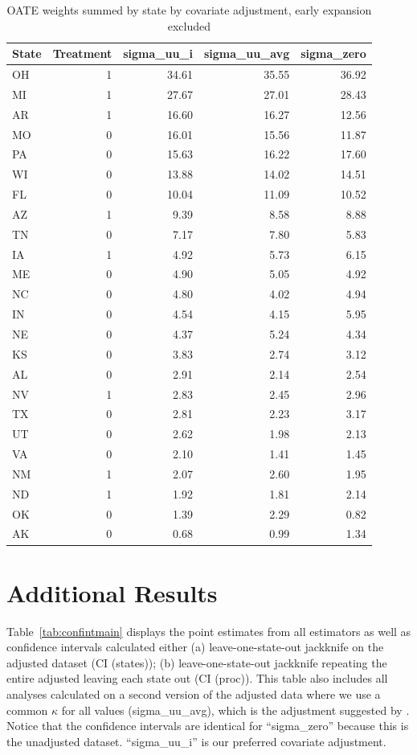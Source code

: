 \documentclass[aoas]{imsart}
\theoremstyle{plain}
\theoremstyle{remark}
\begin{document}
\begin{appendix}
\begin{table}[ht]
\centering
\caption{OATE weights summed by state by covariate adjustment, early expansion excluded}
\label{tab:oatestateweightsc2}
\begin{tabular}{lrrrr}
  \hline
State & Treatment & sigma\_uu\_i & sigma\_uu\_avg & sigma\_zero \\ 
  \hline
OH & 1 & 34.61 & 35.55 & 36.92 \\ 
  MI & 1 & 27.67 & 27.01 & 28.43 \\ 
  AR & 1 & 16.60 & 16.27 & 12.56 \\ 
  MO & 0 & 16.01 & 15.56 & 11.87 \\ 
  PA & 0 & 15.63 & 16.22 & 17.60 \\ 
  WI & 0 & 13.88 & 14.02 & 14.51 \\ 
  FL & 0 & 10.04 & 11.09 & 10.52 \\ 
  AZ & 1 & 9.39 & 8.58 & 8.88 \\ 
  TN & 0 & 7.17 & 7.80 & 5.83 \\ 
  IA & 1 & 4.92 & 5.73 & 6.15 \\ 
  ME & 0 & 4.90 & 5.05 & 4.92 \\ 
  NC & 0 & 4.80 & 4.02 & 4.94 \\ 
  IN & 0 & 4.54 & 4.15 & 5.95 \\ 
  NE & 0 & 4.37 & 5.24 & 4.34 \\ 
  KS & 0 & 3.83 & 2.74 & 3.12 \\ 
  AL & 0 & 2.91 & 2.14 & 2.54 \\ 
  NV & 1 & 2.83 & 2.45 & 2.96 \\ 
  TX & 0 & 2.81 & 2.23 & 3.17 \\ 
  UT & 0 & 2.62 & 1.98 & 2.13 \\ 
  VA & 0 & 2.10 & 1.41 & 1.45 \\ 
  NM & 1 & 2.07 & 2.60 & 1.95 \\ 
  ND & 1 & 1.92 & 1.81 & 2.14 \\ 
  OK & 0 & 1.39 & 2.29 & 0.82 \\ 
  AK & 0 & 0.68 & 0.99 & 1.34 \\ 
   \hline
\end{tabular}
\end{table}

\section{Additional Results}
\label{ssec:allresults}

Table~\ref{tab:confintmain} displays the point estimates from all estimators as well as confidence intervals calculated either (a) leave-one-state-out jackknife on the adjusted dataset (CI (states)); (b) leave-one-state-out jackknife repeating the entire adjusted leaving each state out (CI (proc)). This table also includes all analyses calculated on a second version of the adjusted data where we use a common $\kappa$ for all values (sigma\_uu\_avg), which is the adjustment suggested by \cite{carroll2006measurement}. Notice that the confidence intervals are identical for ``sigma\_zero'' because this is the unadjusted dataset. ``sigma\_uu\_i'' is our preferred covariate adjustment.


\end{appendix}
\end{document}
